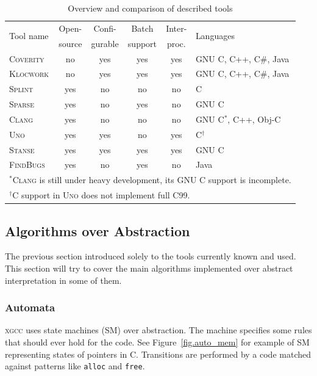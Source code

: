 \documentclass[11pt,a4paper]{article}
\begin{document}
\begin{table}[htb]
\begin{center}
\begin{tabular}{l|ccccl}
\multirow{2}{*}{Tool name} &
Open- &
Confi- &
Batch &
Inter- &
\multirow{2}{*}{Languages} \\
		  & source & gurable & support & proc.  & \\ \hline
\textsc{Coverity} & no   & yes     & yes     & yes    & GNU C, C++, C\#, Java \\
\textsc{Klocwork} & no   & yes     & yes     & yes    & GNU C, C++, C\#, Java \\
\textsc{Splint}	  & yes  & no      & no      & no     & C \\
\textsc{Sparse}   & yes  & no      & yes     & no     & GNU C \\
\textsc{Clang}	  & yes  & no      & no      & no     & GNU C$^*$, C++, Obj-C \\
\textsc{Uno}	  & yes  & yes     & no      & yes    & C$^\dagger$ \\
\textsc{Stanse}	  & yes  & yes     & yes     & yes    & GNU C \\
\textsc{FindBugs} & yes  & no      & yes     & no     & Java \\ \hline
\multicolumn{6}{l}{\footnotesize $^*$\textsc{Clang} is still under heavy
development, its GNU C support is incomplete.} \\
\multicolumn{6}{l}{\footnotesize $^\dagger$C support in \textsc{Uno} does not
implement full C99.} \\
\end{tabular}
\caption{Overview and comparison of described tools}
\label{fig_static_comp}
\end{center}
\end{table}

\subsection{Algorithms over Abstraction}
The previous section introduced solely to the tools currently known and used.
This section will try to cover the main algorithms implemented over abstract
interpretation in some of them.

\subsubsection{Automata}
\label{automata}
\textsc{xgcc} uses state machines (SM) over abstraction. The machine specifies
some rules that should ever hold for the code. See Figure~\ref{fig.auto_mem}
for example of SM representing states of pointers in C. Transitions are
performed by a code matched against patterns like \texttt{alloc} and
\texttt{free}.
\end{document}
